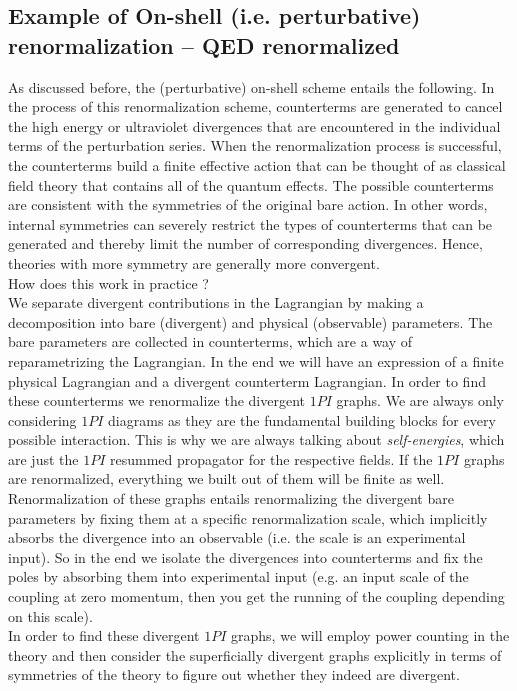 \subsection{Example of  On-shell (i.e. perturbative) renormalization -- QED renormalized}
\label{subsec:renormalizationqed}
As discussed before, the (perturbative) on-shell scheme entails the following. 
In the process of this renormalization scheme, counterterms are generated to cancel the high energy or ultraviolet divergences that are encountered in the individual terms of the perturbation series. When the renormalization process is successful, the counterterms build a finite effective action that can be thought of as classical field theory that contains all of the quantum effects. The possible counterterms are consistent with the symmetries of the original bare action. In other words, internal symmetries can severely restrict the types of counterterms that can be generated and thereby limit the number of corresponding divergences. Hence, theories with more symmetry are generally more convergent.\\
How does this work in practice ?\\
We separate divergent contributions in the Lagrangian by making a decomposition into bare (divergent) and physical (observable) parameters. The bare parameters are collected in counterterms, which are a way of reparametrizing the Lagrangian. In the end we will have an expression of a finite physical Lagrangian and a divergent counterterm Lagrangian. In order to find these counterterms we renormalize the divergent $1PI$ graphs. We are always only considering $1PI$ diagrams as they are the fundamental building blocks for every possible interaction. This is why we are always talking about \emph{self-energies}, which are just the $1PI$ resummed propagator for the respective fields. If the $1PI$ graphs are renormalized, everything we built out of them will be finite as well. Renormalization of these graphs entails renormalizing the divergent bare parameters by fixing them at a specific renormalization scale, which implicitly absorbs the divergence into an observable (i.e. the scale is an experimental input). So in the end we isolate the divergences into counterterms and fix the poles by absorbing them into experimental input (e.g. an input scale of the coupling at zero momentum, then you get the running of the coupling depending on this scale). \\
In order to find these divergent $1PI$ graphs, we will employ power counting in the theory and then consider the superficially divergent graphs explicitly in terms of symmetries of the theory to figure out whether they indeed are divergent.
